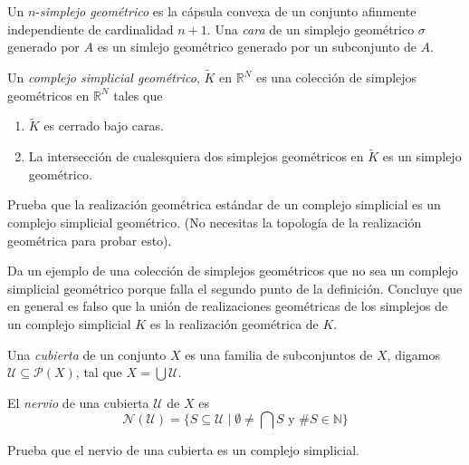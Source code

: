 \documentclass{standalone}
\begin{document}
	\begin{definition}\label{def:geometric_simplex}
		Un $n$-\emph{simplejo geométrico} es la cápsula convexa de un conjunto afinmente independiente de cardinalidad $n+1$. Una \emph{cara} de un simplejo geométrico $\sigma$ generado por $A$ es un simlejo geométrico generado por un subconjunto de $A$.
	\end{definition}
	
	\begin{definition}
		Un \emph{complejo simplicial geométrico}, $\tilde{K}$ en $\mathbb{R}^{N}$ es una colección de simplejos geométricos en $\mathbb{R}^{N}$ tales que
		\begin{enumerate}
			\item $\tilde{K}$ es cerrado bajo caras.
			\item La intersección de cualesquiera dos simplejos geométricos en $\tilde{K}$ es un simplejo geométrico.
		\end{enumerate}
	\end{definition}
	
	\begin{exercise}
		Prueba que la realización geométrica estándar de un complejo simplicial es un complejo simplicial geométrico. (No necesitas la topología de la realización geométrica para probar esto).
	\end{exercise}
	
	\begin{exercise}
		Da un ejemplo de una colección de simplejos geométricos que no sea un complejo simplicial geométrico porque falla el segundo punto de la definición. Concluye que en general es falso que la unión de realizaciones geométricas de los simplejos de un complejo simplicial $K$ es la realización geométrica de $K$.
	\end{exercise}
	
	\begin{definition}\label{def:cover}
		Una \emph{cubierta} de un conjunto $X$ es una familia de subconjuntos de $X$, digamos $\mathcal{U}\subseteq\mathcal{P}(X)$, tal que $X=\bigcup\mathcal{U}$.
	\end{definition}
	
	\begin{definition}\label{def:nerve}
		El \emph{nervio} de una cubierta $\mathcal{U}$ de $X$ es 
		\[
		\mathcal{N}(\mathcal{U})=\{S\subseteq\mathcal{U}\mid \emptyset\neq\bigcap S\text{ y }\#S\in\mathbb{N}\}
		\]
	\end{definition}
	
	\begin{exercise}
		Prueba que el nervio de una cubierta es un complejo simplicial.
	\end{exercise}
	
\end{document}
